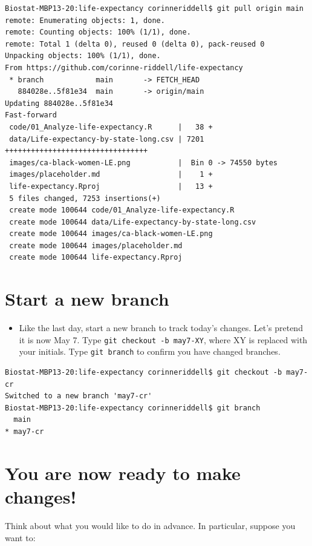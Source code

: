 \documentclass[
]{book}
\providecommand{\tightlist}{%
  \setlength{\itemsep}{0pt}\setlength{\parskip}{0pt}}
\begin{document}
\begin{verbatim}
Biostat-MBP13-20:life-expectancy corinneriddell$ git pull origin main
remote: Enumerating objects: 1, done.
remote: Counting objects: 100% (1/1), done.
remote: Total 1 (delta 0), reused 0 (delta 0), pack-reused 0
Unpacking objects: 100% (1/1), done.
From https://github.com/corinne-riddell/life-expectancy
 * branch            main       -> FETCH_HEAD
   884028e..5f81e34  main       -> origin/main
Updating 884028e..5f81e34
Fast-forward
 code/01_Analyze-life-expectancy.R      |   38 +
 data/Life-expectancy-by-state-long.csv | 7201 +++++++++++++++++++++++++++++++++
 images/ca-black-women-LE.png           |  Bin 0 -> 74550 bytes
 images/placeholder.md                  |    1 +
 life-expectancy.Rproj                  |   13 +
 5 files changed, 7253 insertions(+)
 create mode 100644 code/01_Analyze-life-expectancy.R
 create mode 100644 data/Life-expectancy-by-state-long.csv
 create mode 100644 images/ca-black-women-LE.png
 create mode 100644 images/placeholder.md
 create mode 100644 life-expectancy.Rproj
\end{verbatim}

\hypertarget{start-a-new-branch}{%
\section{Start a new branch}\label{start-a-new-branch}}

\begin{itemize}
\tightlist
\item
  Like the last day, start a new branch to track today's changes. Let's
  pretend it is now May 7. Type \texttt{git\ checkout\ -b\ may7-XY}, where XY is replaced
  with your initials. Type \texttt{git\ branch} to confirm you have changed branches.
\end{itemize}

\begin{verbatim}
Biostat-MBP13-20:life-expectancy corinneriddell$ git checkout -b may7-cr
Switched to a new branch 'may7-cr'
Biostat-MBP13-20:life-expectancy corinneriddell$ git branch
  main
* may7-cr
\end{verbatim}

\hypertarget{you-are-now-ready-to-make-changes}{%
\section{You are now ready to make changes!}\label{you-are-now-ready-to-make-changes}}

Think about what you would like to do in advance. In particular, suppose you
want to:
\end{document}
